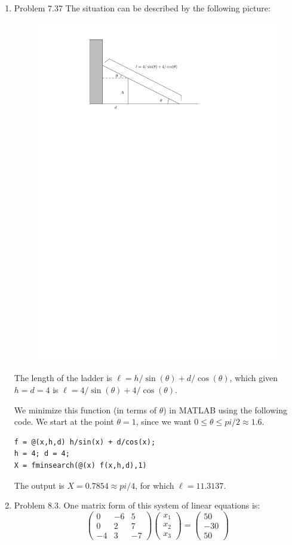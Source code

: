 \documentclass[12pt]{amsart}
\begin{document}
\begin{enumerate}
\item Problem 7.37
The situation can be described by the following
picture:
\begin{figure}[h!]
\includegraphics[width=.7\textwidth]{ladder1.pdf}
\end{figure}
The length of the ladder is $\ell = h/\sin(\theta) + d/\cos(\theta)$,
which given $h=d=4$ is $\ell = 4/\sin(\theta) + 4/\cos(\theta)$.

We minimize this function (in terms of $\theta$)
in MATLAB using the following code. We start at
the point $\theta = 1$, since we want $0\leq \theta \leq pi/2 \approx 1.6$.

\begin{verbatim}
f = @(x,h,d) h/sin(x) + d/cos(x);
h = 4; d = 4;
X = fminsearch(@(x) f(x,h,d),1)
\end{verbatim}

The output is $X = 0.7854 \approx pi/4$, for which
$\ell = 11.3137$.


\vfill
\pagebreak

\item Problem 8.3. One matrix form of this system of linear
equations is:
\[
\left(
\begin{array}{ccc}
0 & -6  & 5 \\
0 & 2 & 7 \\
-4 & 3 & -7
\end{array}
\right)\left( 
\begin{array}{c} x_1 \\ x_2 \\ x_3 \end{array}
\right)
= \left( 
\begin{array}{c} 50 \\ -30 \\ 50 \end{array}
\right)
\]


\end{enumerate}
\end{document}
